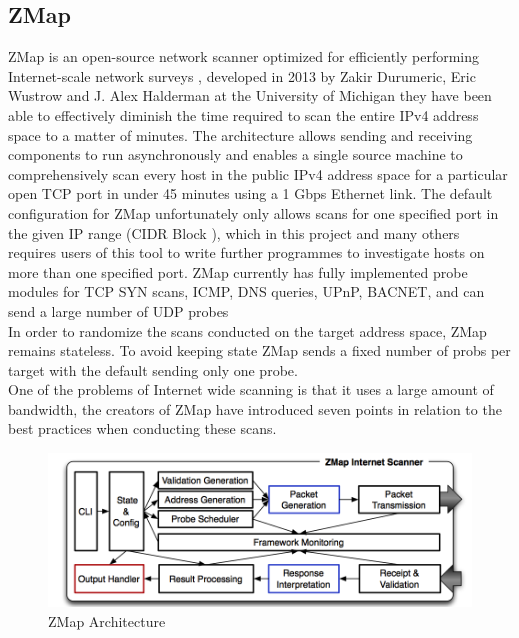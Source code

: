 \documentclass[a4wide,leqno,12pt]{report}
\begin{document}
\subsection{ZMap}
ZMap is an open-source network scanner optimized for efficiently performing
Internet-scale network surveys \cite{durumeric2013zmap}, developed in 2013 by Zakir Durumeric, Eric Wustrow and J. Alex Halderman at the University of Michigan they have been able to effectively diminish the time required to scan the entire IPv4 address space to a matter of minutes. The architecture allows sending and receiving components
to run asynchronously and enables a single source machine to comprehensively scan every host in the public IPv4
address space for a particular open TCP port in under 45 minutes using a 1 Gbps Ethernet link\cite{durumeric2013zmap}. The default configuration for ZMap unfortunately only allows scans for one specified port in the given IP range (CIDR Block \cite{fuller1993classless}), which in this project and many others requires users of this tool to write further programmes to investigate hosts on more than one specified port. ZMap currently has fully implemented probe modules for TCP SYN scans, ICMP, DNS queries, UPnP, BACNET, and can send a large number of UDP probes \cite{zmapGithub}\\

In order to randomize the scans conducted on the target address space, ZMap remains stateless. To avoid keeping state ZMap sends a fixed number of probs per target with the default sending only one probe\cite{durumeric2013zmap}.\\
One of the problems of Internet wide scanning is that it uses a large amount of bandwidth,
the creators of ZMap have introduced seven points in relation to the best practices when conducting these scans\cite{durumeric2013zmap}. \\

\begin{figure}[H]
\centering
\includegraphics[scale=.4]{images/zmap_architecture.png}
\caption{ZMap Architecture}
\end{figure}
\end{document}
